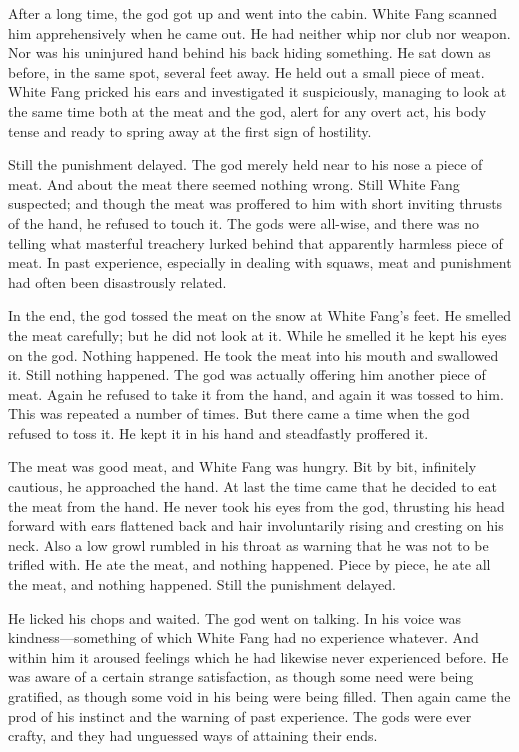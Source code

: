 \documentclass[10pt]{book}
\begin{document}
After a long time, the god got up and went into the cabin. White Fang
scanned him apprehensively when he came out. He had neither whip nor
club nor weapon. Nor was his uninjured hand behind his back hiding
something. He sat down as before, in the same spot, several feet away.
He held out a small piece of meat. White Fang pricked his ears and
investigated it suspiciously, managing to look at the same time both at
the meat and the god, alert for any overt act, his body tense and ready
to spring away at the first sign of hostility.

Still the punishment delayed. The god merely held near to his nose a
piece of meat. And about the meat there seemed nothing wrong. Still
White Fang suspected; and though the meat was proffered to him with
short inviting thrusts of the hand, he refused to touch it. The gods
were all-wise, and there was no telling what masterful treachery lurked
behind that apparently harmless piece of meat. In past experience,
especially in dealing with squaws, meat and punishment had often been
disastrously related.

In the end, the god tossed the meat on the snow at White Fang’s feet.
He smelled the meat carefully; but he did not look at it. While he
smelled it he kept his eyes on the god. Nothing happened. He took the
meat into his mouth and swallowed it. Still nothing happened. The god
was actually offering him another piece of meat. Again he refused to
take it from the hand, and again it was tossed to him. This was
repeated a number of times. But there came a time when the god refused
to toss it. He kept it in his hand and steadfastly proffered it.

The meat was good meat, and White Fang was hungry. Bit by bit,
infinitely cautious, he approached the hand. At last the time came that
he decided to eat the meat from the hand. He never took his eyes from
the god, thrusting his head forward with ears flattened back and hair
involuntarily rising and cresting on his neck. Also a low growl rumbled
in his throat as warning that he was not to be trifled with. He ate the
meat, and nothing happened. Piece by piece, he ate all the meat, and
nothing happened. Still the punishment delayed.

He licked his chops and waited. The god went on talking. In his voice
was kindness—something of which White Fang had no experience whatever.
And within him it aroused feelings which he had likewise never
experienced before. He was aware of a certain strange satisfaction, as
though some need were being gratified, as though some void in his being
were being filled. Then again came the prod of his instinct and the
warning of past experience. The gods were ever crafty, and they had
unguessed ways of attaining their ends.
\end{document}
